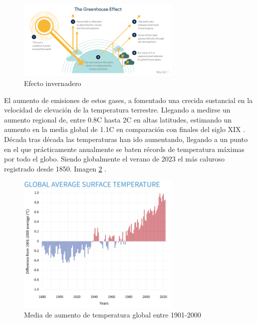 \begin{figure} [H]
	\centering
	\includegraphics[width=0.7\textwidth]{fig/climate-change_greenhouse-effect_steps.png}
	\caption[Efecto invernadero]{Efecto invernadero \footnotemark}
	\label{fig:ej17}
\end{figure}

El aumento de emisiones de estos gases, a fomentado una crecida sustancial en la velocidad de elevación de la temperatura terrestre. Llegando a medirse un aumento regional de, entre 0.8\textdegree C hasta 2\textdegree C en altas latitudes, estimando un aumento en la media global de 1.1\textdegree C en comparación con finales del siglo XIX \cite{ruddiman2003anthropogenic}.\newline
\newline
Década tras década las temperaturas han ido aumentando, llegando a un punto en el que prácticamente anualmente se baten récords de temperatura máximas por todo el globo. Siendo globalmente el verano de 2023 el más caluroso registrado desde 1850. Imagen \ref{fig:ej18} \cite{NCEIWeb}.

\begin{figure} [H]
	\centering
	\includegraphics[width=0.7\textwidth]{fig/ClimateDashboard-global-surface-temperature-graph-20230118-1400px.png}
	\caption[Media de aumento de temperatura global entre 1901-2000]{Media de aumento de temperatura global entre 1901-2000 \footnotemark}
	\label{fig:ej18}
\end{figure}

